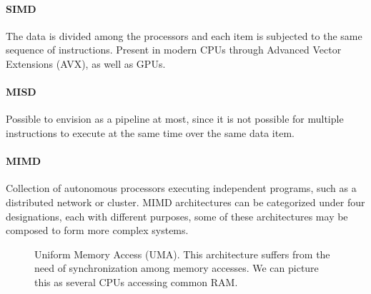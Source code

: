 \paragraph{SIMD}
The data is divided among the processors and each item is subjected to the same sequence of instructions. Present in modern CPUs through Advanced Vector Extensions (AVX), as well as GPUs.


\paragraph{MISD}
Possible to envision as a pipeline at most, since it is not possible for multiple instructions to execute at the same time over the same data item.

\paragraph{MIMD}
Collection of autonomous processors executing independent programs, such as a distributed network or cluster.
MIMD architectures can be categorized under four designations, each with different purposes, some of these architectures may be composed to form more complex systems.

\begin{figure}[h]
    \centering
    \caption{Uniform Memory Access (UMA). This architecture suffers from the need of synchronization among memory accesses. We can picture this as several CPUs accessing common RAM.}
    \label{fig:sm:uma}
\end{figure}


